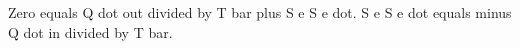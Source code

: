 Zero equals Q dot out divided by T bar plus S e S e dot. S e S e dot equals minus Q dot in divided by T bar.